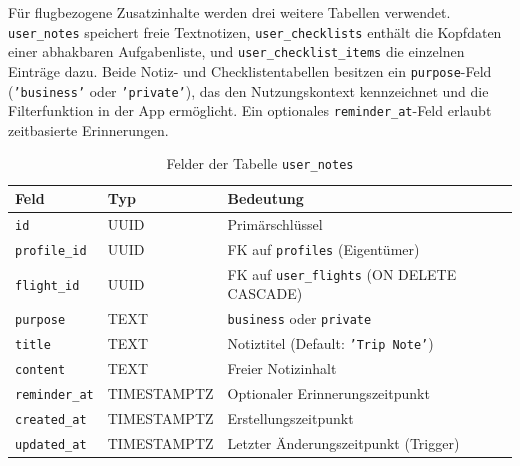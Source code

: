 Für flugbezogene Zusatzinhalte werden drei weitere Tabellen verwendet.
\texttt{user\_notes} speichert freie Textnotizen, \texttt{user\_checklists}
enthält die Kopfdaten einer abhakbaren Aufgabenliste, und
\texttt{user\_checklist\_items} die einzelnen Einträge dazu.
Beide Notiz- und Checklistentabellen besitzen ein \texttt{purpose}-Feld
(\texttt{'business'} oder \texttt{'private'}), das den Nutzungskontext
kennzeichnet und die Filterfunktion in der App ermöglicht.
Ein optionales \texttt{reminder\_at}-Feld erlaubt zeitbasierte Erinnerungen.

\begin{table}[H]
  \centering
  \caption{Felder der Tabelle \texttt{user\_notes}}
  \label{tab:user_notes_felder}
  \begin{tabularx}{\textwidth}{l l X}
    \toprule
    \textbf{Feld} & \textbf{Typ} & \textbf{Bedeutung} \\
    \midrule
    \texttt{id}          & UUID        & Primärschlüssel \\
    \texttt{profile\_id} & UUID        & FK auf \texttt{profiles} (Eigentümer) \\
    \texttt{flight\_id}  & UUID        & FK auf \texttt{user\_flights} (ON DELETE CASCADE) \\
    \texttt{purpose}     & TEXT        & \texttt{business} oder \texttt{private} \\
    \texttt{title}       & TEXT        & Notiztitel (Default: \texttt{'Trip Note'}) \\
    \texttt{content}     & TEXT        & Freier Notizinhalt \\
    \texttt{reminder\_at}& TIMESTAMPTZ & Optionaler Erinnerungszeitpunkt \\
    \texttt{created\_at} & TIMESTAMPTZ & Erstellungszeitpunkt \\
    \texttt{updated\_at} & TIMESTAMPTZ & Letzter Änderungszeitpunkt (Trigger) \\
    \bottomrule
  \end{tabularx}
\end{table}

